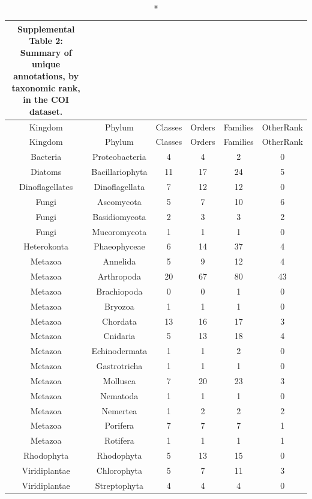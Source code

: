 \documentclass[fleqn,10pt,lineno]{wlpeerj} %
\begin{document}
\begin{longtable}[]{@{}cccccc@{}}
\caption*{Supplemental Table 2: Summary of unique annotations, by taxonomic rank, in the COI
dataset.}\tabularnewline
\toprule
Kingdom & Phylum & Classes & Orders & Families &
OtherRank\tabularnewline
\midrule
\endfirsthead
\toprule
Kingdom & Phylum & Classes & Orders & Families &
OtherRank\tabularnewline
\midrule
\endhead
Bacteria & Proteobacteria & 4 & 4 & 2 & 0\tabularnewline
Diatoms & Bacillariophyta & 11 & 17 & 24 & 5\tabularnewline
Dinoflagellates & Dinoflagellata & 7 & 12 & 12 & 0\tabularnewline
Fungi & Ascomycota & 5 & 7 & 10 & 6\tabularnewline
Fungi & Basidiomycota & 2 & 3 & 3 & 2\tabularnewline
Fungi & Mucoromycota & 1 & 1 & 1 & 0\tabularnewline
Heterokonta & Phaeophyceae & 6 & 14 & 37 & 4\tabularnewline
Metazoa & Annelida & 5 & 9 & 12 & 4\tabularnewline
Metazoa & Arthropoda & 20 & 67 & 80 & 43\tabularnewline
Metazoa & Brachiopoda & 0 & 0 & 1 & 0\tabularnewline
Metazoa & Bryozoa & 1 & 1 & 1 & 0\tabularnewline
Metazoa & Chordata & 13 & 16 & 17 & 3\tabularnewline
Metazoa & Cnidaria & 5 & 13 & 18 & 4\tabularnewline
Metazoa & Echinodermata & 1 & 1 & 2 & 0\tabularnewline
Metazoa & Gastrotricha & 1 & 1 & 1 & 0\tabularnewline
Metazoa & Mollusca & 7 & 20 & 23 & 3\tabularnewline
Metazoa & Nematoda & 1 & 1 & 1 & 0\tabularnewline
Metazoa & Nemertea & 1 & 2 & 2 & 2\tabularnewline
Metazoa & Porifera & 7 & 7 & 7 & 1\tabularnewline
Metazoa & Rotifera & 1 & 1 & 1 & 1\tabularnewline
Rhodophyta & Rhodophyta & 5 & 13 & 15 & 0\tabularnewline
Viridiplantae & Chlorophyta & 5 & 7 & 11 & 3\tabularnewline
Viridiplantae & Streptophyta & 4 & 4 & 4 & 0\tabularnewline
\bottomrule
\end{longtable}
\end{document}
